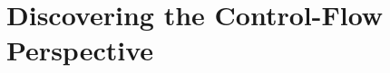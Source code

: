 \chapter{Discovering the Control-Flow Perspective}
\label{chap:project-mining2}


%

%


%

%

%

%


